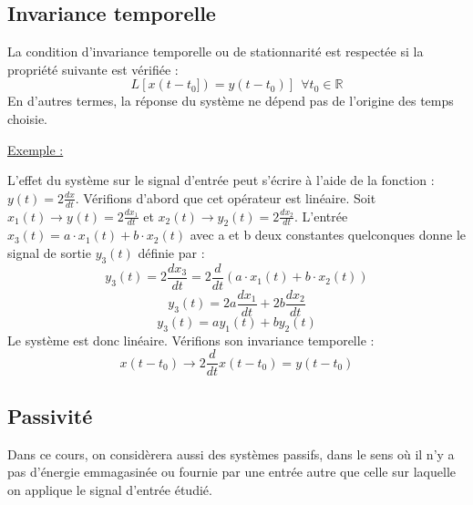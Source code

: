 \documentclass[]{report}
\begin{document}
	\subsection{Invariance temporelle}
	La condition d'invariance temporelle ou de stationnarité est respectée si la propriété suivante est vérifiée :
	\begin{equation}
	L[x(t-t_{0}]) = y(t-t_{0})]   ~~\forall t_{0} \in \mathbb{R}
	\end{equation}
	En d'autres termes, la réponse du système ne dépend pas de l'origine des temps choisie.
	
	\vspace{1\baselineskip}
	\underline{Exemple :}
	\vspace{0.5\baselineskip}
	

	
	L'effet du système sur le signal d'entrée peut s'écrire à l'aide de la fonction : $y(t)=2\frac{dx}{dt}$.
	Vérifions d'abord que cet opérateur est linéaire. Soit $ x_{1}(t)\rightarrow y_{}(t)=2\frac{dx_{1}}{dt}$ et  $ x_{2}(t)\rightarrow y_{2}(t)=2\frac{dx_{2}}{dt}$. L'entrée $x_{3}(t)=a\cdot x_{1}(t)+b\cdot x_{2}(t) $ avec a et b deux constantes quelconques donne le signal de sortie $y_{3}(t)$ définie par :
	\begin{equation*}
	y_{3}(t)=2\frac{dx_{3}}{dt}=2\frac{d}{dt}(a\cdot x_{1}(t)+b\cdot x_{2}(t))
	\end{equation*}
	\begin{equation*}
	y_{3}(t)=2a\frac{dx_{1}}{dt}+2b\frac{dx_{2}}{dt}
	\end{equation*}
	\begin{equation*}
	y_{3}(t)=ay_{1}(t)+by_{2}(t)
	\end{equation*}
	Le système est donc linéaire. Vérifions son invariance temporelle :
	\begin{equation*}
	x(t-t_{0}) \rightarrow 2\frac{d}{dt}x(t-t_{0})=y(t-t_{0})
	\end{equation*}
	
	
	\subsection{Passivité}
	Dans ce cours, on considèrera aussi des systèmes passifs, dans le sens où il n'y a pas d'énergie emmagasinée ou fournie par une entrée autre que celle sur laquelle on applique le signal d'entrée étudié.
\end{document}
